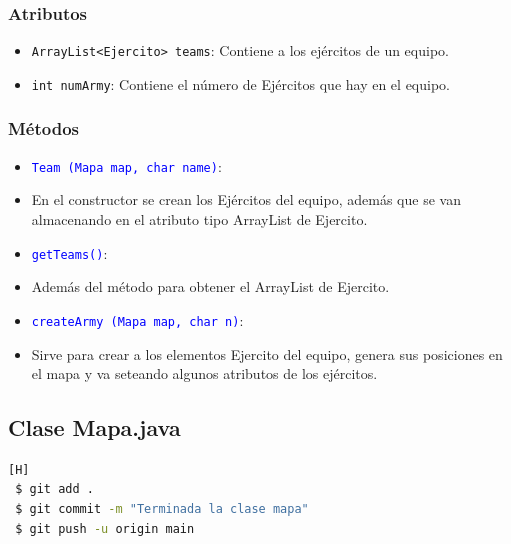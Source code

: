 \documentclass{article}
\begin{document}
\subsubsection{Atributos}
\begin{itemize}
    \item \texttt{ArrayList<Ejercito> teams}: Contiene a los ejércitos de un equipo.
    \item \texttt{int numArmy}: Contiene el número de Ejércitos que hay en el equipo.
\end{itemize}


\subsubsection{Métodos}
\begin{itemize}
    \item \texttt{\textcolor{blue}{Team (Mapa map, char name)}}: 
    \item En el constructor se crean los Ejércitos del equipo, además que se van almacenando en el atributo tipo ArrayList de Ejercito.
\end{itemize}

\begin{itemize}
    \item \texttt{\textcolor{blue}{getTeams()}}: 
    \item Además del método para obtener el ArrayList de Ejercito.
\end{itemize}

\newpage
\begin{itemize}
    \item \texttt{\textcolor{blue}{createArmy (Mapa map, char n)}}: 
    \item Sirve para crear a los elementos Ejercito del equipo, genera sus posiciones en el mapa y va seteando algunos atributos de los ejércitos.
\end{itemize}


\newpage
\subsection{Clase Mapa.java}
\begin{lstlisting}[language=bash,caption={Commit \href{https://github.com/hernanchoquehuanca/fp2-23b/commit/1a0586ff7f8bb3b99f7e0c7a74e9bb209487b2c5}{379f06f}: Terminada la clase mapa
}][H]
 $ git add .
 $ git commit -m "Terminada la clase mapa"			
 $ git push -u origin main
\end{lstlisting}
\end{document}
